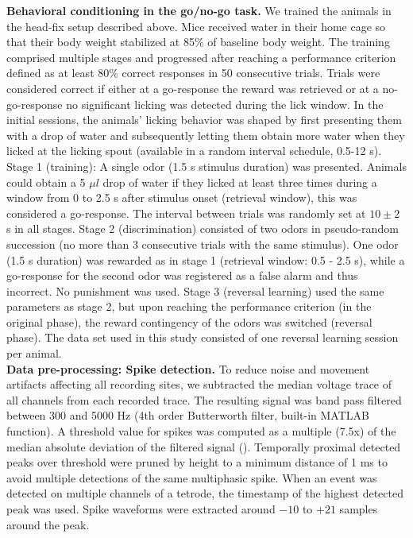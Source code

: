\textbf{Behavioral conditioning in the go/no-go task.} We trained the animals in the head-fix setup described above. Mice received water in their home cage so that their body weight stabilized at 85$\%$ of baseline body weight. The training comprised multiple stages and progressed after reaching a performance criterion defined as at least 80$\%$ correct responses in 50 consecutive trials. Trials were considered correct if either at a go-response the reward was retrieved or at a no-go-response no significant licking was detected during the lick window. In the initial sessions, the animals’ licking behavior was shaped by first presenting them with a drop of water and subsequently letting them obtain more water when they licked at the licking spout (available in a random interval schedule, 0.5-12 s). Stage 1 (training): A single odor (1.5 s stimulus duration) was presented. Animals could obtain a 5 $\mu l$ drop of water if they licked at least three times during a window from 0 to 2.5 s after stimulus onset (retrieval window), this was considered a go-response. The interval between trials was randomly set at $10\pm 2$ s in all stages. Stage 2 (discrimination) consisted of two odors in pseudo-random succession (no more than 3 consecutive trials with the same stimulus). One odor (1.5 s duration) was rewarded as in stage 1 (retrieval window: 0.5 - 2.5 s), while a go-response for the second odor was registered as a false alarm and thus incorrect. No punishment was used. Stage 3 (reversal learning) used the same parameters as stage 2, but upon reaching the performance criterion (in the original phase), the reward contingency of the odors was switched (reversal phase). The data set used in this study consisted of one reversal learning session per animal.\\%
\textbf{Data pre-processing: Spike detection.} To reduce noise and movement artifacts affecting all recording sites, we subtracted the median voltage trace of all channels from each recorded trace. The resulting signal was band pass filtered between 300 and 5000 Hz (4th order Butterworth filter, built-in MATLAB function). A threshold value for spikes was computed as a multiple (7.5x) of the median absolute deviation of the filtered signal (\cite{Quiroga}). Temporally proximal detected peaks over threshold were pruned by height to a minimum distance of 1 ms to avoid multiple detections of the same multiphasic spike. When an event was detected on multiple channels of a tetrode, the timestamp of the highest detected peak was used. Spike waveforms were extracted around $-10$ to $+21$ samples around the peak.\\

